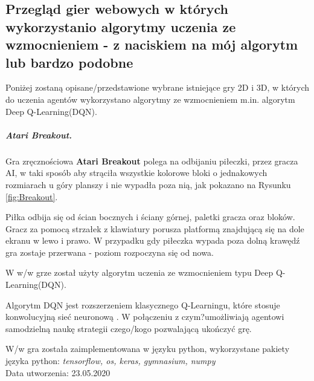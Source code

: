 \documentclass{iiuwb}
\begin{document}
\begin{itemize}



\chapter{Przegląd gier webowych w których wykorzystanio algorytmy uczenia ze wzmocnieniem - z naciskiem na mój algorytm lub bardzo podobne}

Poniżej zostaną opisane/przedstawione wybrane istniejące gry 2D i 3D, w których do uczenia agentów wykorzystano algorytmy ze wzmocnieniem m.in. algorytm Deep Q-Learning(DQN).

\paragraph{Atari Breakout.}

Gra zręcznościowa \textbf{Atari Breakout} polega na odbijaniu piłeczki, przez gracza AI, w taki sposób aby strąciła wszystkie kolorowe bloki o jednakowych rozmiarach u góry planszy i nie wypadła poza nią, jak pokazano na Rysunku \ref{fig:Breakout}.

Piłka odbija się od ścian bocznych i ściany górnej, paletki gracza oraz bloków. Gracz za pomocą strzałek z klawiatury porusza platformą znajdującą się na dole ekranu w lewo i prawo. W przypadku gdy piłeczka wypada poza dolną krawędź gra zostaje przerwana - poziom rozpoczyna się od nowa.

W w/w grze został użyty algorytm uczenia ze wzmocnieniem typu Deep Q-Learning(DQN)\cite{AtariBreakout}.

Algorytm DQN jest rozszerzeniem klasycznego Q-Learningu, które stosuje konwolucyjną sieć neuronową \cite{Ohnishi}. W połączeniu z czym?umożliwiają agentowi samodzielną naukę strategii czego/kogo pozwalającą ukończyć grę.

W/w gra została zaimplementowana w języku python, wykorzystane pakiety języka python: \textit{tensorflow, os, keras, gymnasium, numpy}\\
Data utworzenia: 23.05.2020


\end{itemize}
\end{document}
